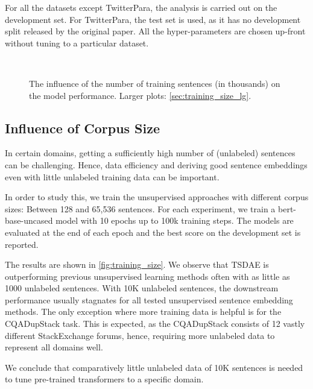 \documentclass[11pt]{article}
\begin{document}
For all the datasets except TwitterPara, the analysis is carried out on the development set. For TwitterPara, the test set is used, as it has no development split released by the original paper. All the hyper-parameters are chosen up-front without tuning to a particular dataset.


\begin{figure}[t]
  \centering
   \\
  \caption{The influence of the number of training sentences (in thousands) on the model performance. Larger plots: \autoref{sec:training_size_lg}.}
  \label{fig:training_size}
\end{figure}

\subsection{Influence of Corpus Size} 
In certain domains, getting a sufficiently high number of (unlabeled) sentences can be challenging. Hence, data efficiency and deriving good sentence embeddings even with little unlabeled training data can be important. 

In order to study this, we train the unsupervised approaches with different corpus sizes: Between 128 and 65,536 sentences. For each experiment, we train a bert-base-uncased model with 10 epochs up to 100k training steps. The models are evaluated at the end of each epoch and the best score on the development set is reported. 

The results are shown in \autoref{fig:training_size}. We observe that TSDAE is outperforming previous unsupervised learning methods often with as little as 1000 unlabeled sentences. With 10K unlabeled sentences, the downstream performance usually stagnates for all tested unsupervised sentence embedding methods. The only exception where more training data is helpful is for the CQADupStack task. This is expected, as the CQADupStack consists of 12 vastly different StackExchange forums, hence, requiring more unlabeled data to represent all domains well.

We conclude that comparatively little unlabeled data of 10K sentences is needed to tune pre-trained transformers to a specific domain.
\end{document}
